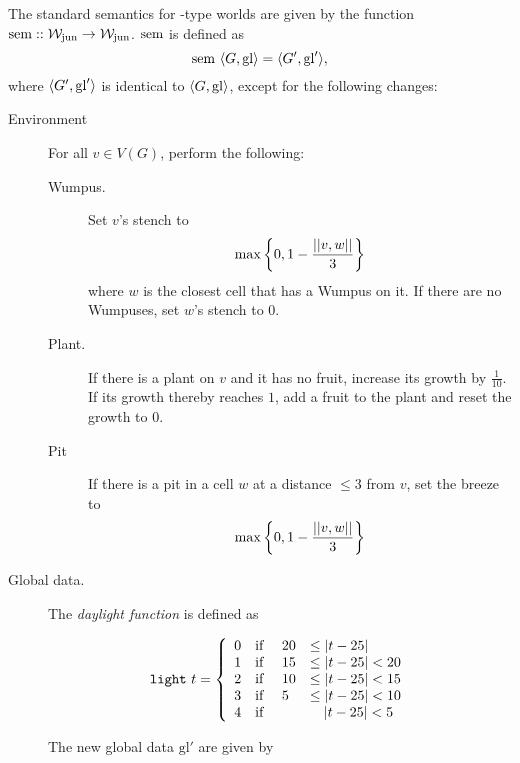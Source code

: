 \begin{definition}
\label{def:ssem}
The standard semantics for \wjun-type worlds are given by the function $\mathrm{sem} :: \mathtt{\mathcal{W}_{\mathrm{jun}} \rightarrow \mathcal{W}_{\mathrm{jun}}}$. $\mathrm{sem}$ is defined as 
$$\mathrm{sem}\ \langle G, \mathrm{gl} \rangle = \langle G', \mathrm{gl}' \rangle, $$
where $\langle G', \mathrm{gl}' \rangle$ is identical to $\langle G, \mathrm{gl} \rangle$, except for the following changes:

\begin{description}
	\item[Environment] For all $v \in V(G)$, perform the following:
	
	\begin{description}
		\item[Wumpus.] Set $v$'s stench to
		$$
			\mathrm{max}\left\{0, 1 - \frac{||{v},{w}||}{3}\right\}
		$$
		where $w$ is the closest cell that has a Wumpus on it. If there are no Wumpuses, set $w$'s stench to 0.
		
		\item[Plant.] If there is a plant on $v$ and it has no fruit, increase its growth by $\frac{1}{10}$. If its growth thereby reaches $1$, add a fruit to the plant and reset the growth to 0.
		
		\item[Pit] If there is a pit in a cell $w$ at a distance $\leq 3$ from $v$, set the breeze to
 		$$
			\mathrm{max}\left\{0, 1 - \frac{||{v},{w}||}{3}\right\}
		$$
	\end{description}
	
	\item[Global data.] The {\em daylight function} is defined as
	
	$$
			\mathtt{light}\ t = 
			\left\{
				\begin{array}{l l l l}
					0 & \textnormal{if } & 20 & \leq |t - 25|\\
					1 & \textnormal{if } & 15 & \leq |t - 25| < 20\\
					2 & \textnormal{if } & 10 & \leq |t - 25| < 15\\
					3 & \textnormal{if } & 5 & \leq |t - 25| < 10\\
					4 & \textnormal{if } & & \ \ \ |t - 25| < 5
				\end{array}
			\right.
	$$
	
	The new global data $\mathrm{gl}'$ are given by
	

\end{description}
\end{definition}
